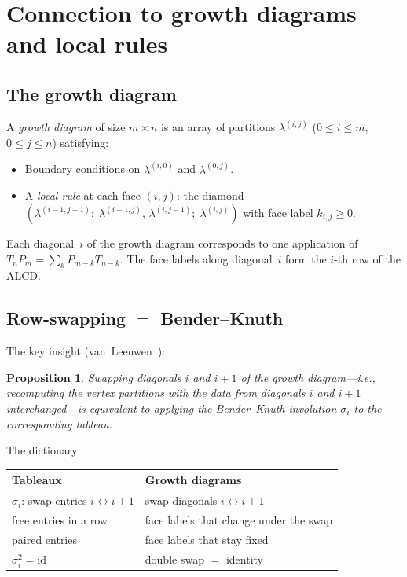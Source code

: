 \documentclass[11pt]{article}
\theoremstyle{plain}
\newtheorem{proposition}[theorem]{Proposition}
\theoremstyle{definition}
\begin{document}
\section{Connection to growth diagrams and local rules}
\label{sec:growth}

\subsection{The growth diagram}

A \emph{growth diagram} of size $m \times n$ is an array of
partitions $\lambda^{(i,j)}$ ($0 \leq i \leq m$,
$0 \leq j \leq n$) satisfying:
\begin{itemize}
  \item Boundary conditions on $\lambda^{(i,0)}$ and
    $\lambda^{(0,j)}$.
  \item A \emph{local rule} at each face $(i,j)$: the diamond
    $(\lambda^{(i-1,j-1)};\; \lambda^{(i-1,j)},\,
    \lambda^{(i,j-1)};\; \lambda^{(i,j)})$ with face label
    $k_{i,j} \geq 0$.
\end{itemize}
Each diagonal~$i$ of the growth diagram corresponds to one
application of
$T_n P_m = \sum_k P_{m-k} T_{n-k}$.
The face labels along diagonal~$i$ form the $i$-th row of the
ALCD\@.


\subsection{Row-swapping $=$ Bender--Knuth}

The key insight (van~Leeuwen~\cite{vanLeeuwen}):

\begin{proposition}
\label{prop:row-swap}
Swapping diagonals $i$ and $i+1$ of the growth
diagram---i.e., recomputing the vertex partitions with the
data from diagonals $i$ and $i+1$ interchanged---is equivalent
to applying the Bender--Knuth involution $\sigma_i$ to the
corresponding tableau.
\end{proposition}

The dictionary:
\begin{center}
\begin{tabular}{l|l}
\textbf{Tableaux} & \textbf{Growth diagrams} \\ \hline
$\sigma_i$: swap entries $i \leftrightarrow i+1$ &
  swap diagonals $i \leftrightarrow i+1$ \\
free entries in a row &
  face labels that change under the swap \\
paired entries &
  face labels that stay fixed \\
$\sigma_i^2 = \mathrm{id}$ &
  double swap $=$ identity
\end{tabular}
\end{center}
\end{document}
